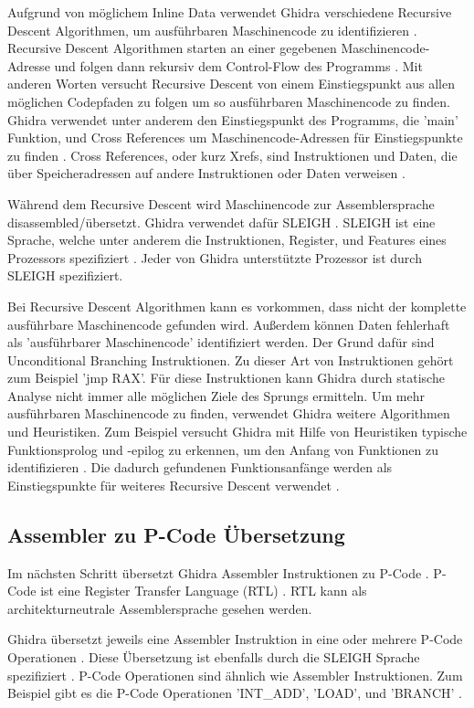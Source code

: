 Aufgrund von möglichem Inline Data verwendet Ghidra verschiedene Recursive Descent Algorithmen, um ausführbaren Maschinencode zu identifizieren \cite{3}. Recursive Descent Algorithmen starten an einer gegebenen Maschinencode-Adresse und folgen dann rekursiv dem Control-Flow des Programms \cite{3}. Mit anderen Worten versucht Recursive Descent von einem Einstiegspunkt aus allen möglichen Codepfaden zu folgen um so ausführbaren Maschinencode zu finden. Ghidra verwendet unter anderem den Einstiegspunkt des Programms, die 'main' Funktion, und Cross References um Maschinencode-Adressen für Einstiegspunkte zu finden \cite{3}. Cross References, oder kurz Xrefs, sind Instruktionen und Daten, die über Speicheradressen auf andere Instruktionen oder Daten verweisen \cite{6}.

Während dem Recursive Descent wird Maschinencode zur Assemblersprache disassembled/übersetzt. Ghidra verwendet dafür SLEIGH \cite{7}. SLEIGH ist eine Sprache, welche unter anderem die Instruktionen, Register, und Features eines Prozessors spezifiziert \cite{7}. Jeder von Ghidra unterstützte Prozessor ist durch SLEIGH spezifiziert. 

Bei Recursive Descent Algorithmen kann es vorkommen, dass nicht der komplette ausführbare Maschinencode gefunden wird. Außerdem können Daten fehlerhaft als 'ausführbarer Maschinencode' identifiziert werden. Der Grund dafür sind Unconditional Branching Instruktionen. Zu dieser Art von Instruktionen gehört zum Beispiel 'jmp RAX'. Für diese Instruktionen kann Ghidra durch statische Analyse nicht immer alle möglichen Ziele des Sprungs ermitteln. Um mehr ausführbaren Maschinencode zu finden, verwendet Ghidra weitere Algorithmen und Heuristiken. Zum Beispiel versucht Ghidra mit Hilfe von Heuristiken typische Funktionsprolog und -epilog zu erkennen, um den Anfang von Funktionen zu identifizieren \cite{3}. Die dadurch gefundenen Funktionsanfänge werden als Einstiegspunkte für weiteres Recursive Descent verwendet \cite{3}.

\subsection{Assembler zu P-Code Übersetzung}

Im nächsten Schritt übersetzt Ghidra Assembler Instruktionen zu P-Code \cite{4}. P-Code ist eine Register Transfer Language (RTL) \cite{4}. RTL kann als architekturneutrale Assemblersprache gesehen werden. 

Ghidra übersetzt jeweils eine Assembler Instruktion in eine oder mehrere P-Code Operationen \cite{4}. Diese Übersetzung ist ebenfalls durch die SLEIGH Sprache spezifiziert \cite{7}. P-Code Operationen sind ähnlich wie Assembler Instruktionen. Zum Beispiel gibt es die P-Code Operationen 'INT\_ADD', 'LOAD', und 'BRANCH' \cite{4}.

